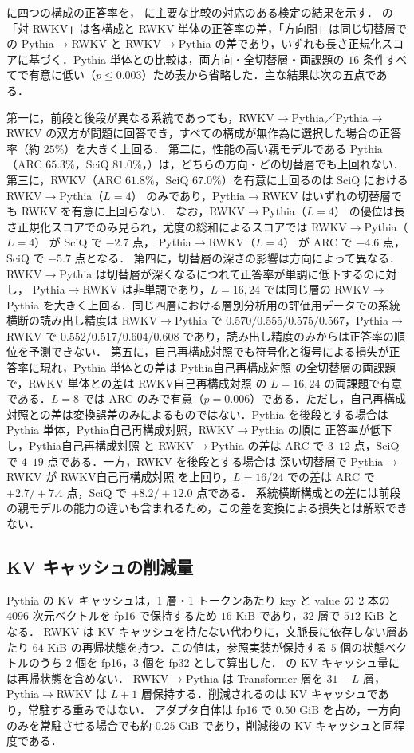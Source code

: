 \documentclass[techrep,noauthor]{ipsj}
\newcommand{\rev}[1]{{\color{blue}#1}}
\newcommand{\revr}[1]{{\color{red}#1}}
\newcommand{\revp}[1]{{\color{violet}#1}}
\newcommand{\revy}[1]{{\color{revyellow}#1}}
\newcommand{\RWKVself}{\textsf{RWKV自己再構成対照}}
\newcommand{\Pythiaself}{\textsf{Pythia自己再構成対照}}
\newcommand{\RtoP}{\textsf{RWKV$\to$\allowbreak Pythia}}
\newcommand{\PtoR}{\textsf{Pythia$\to$\allowbreak RWKV}}
\newcommand{\RtoPL}[1]{\RtoP{}（$L{=}#1$）}
\newcommand{\PtoRL}[1]{\PtoR{}（$L{=}#1$）}
\begin{document}
\rev{ に四つの構成の正答率を， に主要な比較の対応のある検定の結果を示す．\tabref{tab:paired} の「対 RWKV」は各構成と RWKV 単体の正答率の差，「方向間」は同じ切替層での \PtoR{} と \RtoP{} の差であり，いずれも長さ正規化スコアに基づく．Pythia 単体との比較は，両方向・全切替層・両課題の $16$ 条件すべてで有意に低い（$p\le0.003$）ため表から省略した．主な結果は次の五点である．

第一に，前段と後段が異なる系統であっても，\RtoP{}／\PtoR{} の双方が問題に回答でき，すべての構成が無作為に選択した場合の正答率（約 $25\%$）を大きく上回る．
第二に，性能の高い親モデルである Pythia\revp{（ARC $65.3\%$，SciQ $81.0\%$，\tabref{tab:kv}）}は，どちらの方向・どの切替層でも上回れない．
第三に，RWKV\revp{（ARC $61.8\%$，SciQ $67.0\%$）}を有意に上回るのは SciQ における \RtoPL{4} のみであり，\PtoR{} はいずれの切替層でも RWKV を有意に上回らない．
なお，\RtoPL{4} の優位は長さ正規化スコアでのみ見られ，尤度の総和によるスコアでは \RtoPL{4} が SciQ で $-2.7$ 点，
\PtoRL{4} が ARC で $-4.6$ 点，SciQ で $-5.7$ 点となる．
第四に，切替層の深さの影響は方向によって異なる．\RtoP{} は切替層が深くなるにつれて正答率が単調に低下するのに対し，
\PtoR{} は非単調であり，$L{=}16,24$ では同じ層の \RtoP{} を大きく上回る．同じ四層における\revp{層別分析用の評価用データでの}\revr{系統横断の読み出し精度}は
\RtoP{} で $0.570/0.555/0.575/0.567$，\PtoR{} で $0.552/0.517/0.604/0.608$ であり，読み出し精度のみからは正答率の順位を予測できない．
第五に，\revr{自己再構成対照でも符号化と復号による損失が正答率に現れ，Pythia 単体との差は \Pythiaself{} の全切替層の両課題で，RWKV 単体との差は \RWKVself{} の $L{=}16,24$ の両課題で有意である．\revy{$L{=}8$ では ARC のみで有意（$p{=}0.006$）である．}ただし，}自己再構成対照との差は変換誤差のみによるものではない．Pythia を後段とする場合は Pythia 単体，\Pythiaself{}，\RtoP{} の順に
正答率が低下し，\Pythiaself{} と \RtoP{} の差は ARC で $3$--$12$ 点，SciQ で $4$--$19$ 点である．一方，RWKV を後段とする場合は
深い切替層で \PtoR{} が \RWKVself{} を上回り，$L{=}16/24$ での差は ARC で $+2.7/+7.4$ 点，SciQ で $+8.2/+12.0$ 点である．
系統横断構成との差には前段の親モデルの能力の違いも含まれるため，この差を変換による損失とは解釈できない．}

\subsection{\revr{KV キャッシュの削減量}}\label{sec:kv}
\revr{Pythia の KV キャッシュは，1 層・1 トークンあたり key と value の 2 本の $4096$ 次元ベクトルを fp16 で保持するため $16$ KiB であり，$32$ 層で $512$ KiB となる．
RWKV は KV キャッシュを持たない代わりに，文脈長に依存しない層あたり $64$ KiB の再帰状態を持つ．この値は，参照実装が保持する
$5$ 個の状態ベクトルのうち $2$ 個を fp16，$3$ 個を fp32 として算出した．\tabref{tab:kv} の KV キャッシュ量には再帰状態を含めない．
\RtoP{} は Transformer 層を $31{-}L$ 層，\PtoR{} は $L{+}1$ 層保持する．削減されるのは KV キャッシュであり，常駐する重みではない．
アダプタ自体は fp16 で $0.50$ GiB を占め，一方向のみを常駐させる場合でも約 $0.25$ GiB であり，削減後の KV キャッシュと同程度である．}
\end{document}
